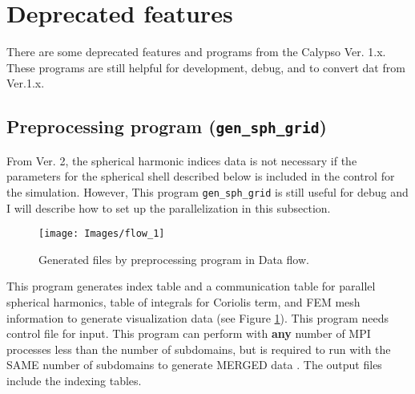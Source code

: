 \newpage
\section{Deprecated features}
There are some deprecated features and programs from the Calypso Ver. 1.x. These programs are still helpful for development, debug, and to convert dat from Ver.1.x.

\subsection{Preprocessing program ({\tt gen\_sph\_grid})}
\label{section:gen_sph_grid}
%
From Ver. 2, the spherical harmonic indices data is not necessary if the parameters for the spherical shell described below is included in the control for the simulation. However, This program \verb|gen_sph_grid| is still useful for debug and I will describe how to set up the parallelization in this subsection.
%
\begin{figure}[htbp]
\begin{center}
\texttt{[image: Images/flow\_1]}
\end{center}
\caption{Generated files by preprocessing program in Data flow.}
\label{fig:gen_sph_grid}
\end{figure}
%
This program generates index table and a communication table for parallel spherical harmonics, table of integrals for Coriolis term, and FEM mesh information to generate visualization data (see Figure \ref{fig:gen_sph_grid}). This program needs control file for input. This program can perform with {\bf any} number of MPI processes less than the number of subdomains, but is required to run with the SAME number of subdomains to generate MERGED data . The output files include the indexing tables. 


